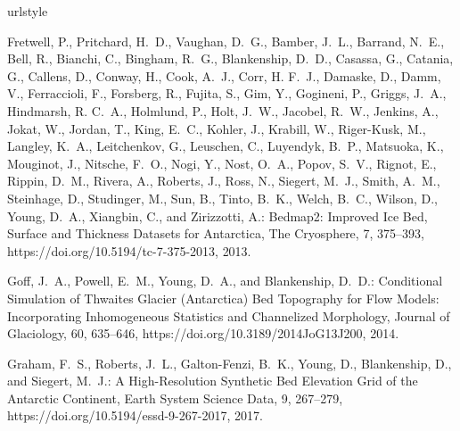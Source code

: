 \begin{thebibliography}{7}
\providecommand{\natexlab}[1]{#1}
\providecommand{\url}[1]{{\tt #1}}
\providecommand{\urlprefix}{URL }
\expandafter\ifx\csname urlstyle\endcsname\relax
  \providecommand{\doi}[1]{https://doi.org/\discretionary{}{}{}#1}\else
  \providecommand{\doi}{https://doi.org/\discretionary{}{}{}\begingroup
  \urlstyle{rm}\Url}\fi

Fretwell, P., Pritchard, H.~D., Vaughan, D.~G., Bamber, J.~L., Barrand, N.~E.,
  Bell, R., Bianchi, C., Bingham, R.~G., Blankenship, D.~D., Casassa, G.,
  Catania, G., Callens, D., Conway, H., Cook, A.~J., Corr, H. F.~J., Damaske,
  D., Damm, V., Ferraccioli, F., Forsberg, R., Fujita, S., Gim, Y., Gogineni,
  P., Griggs, J.~A., Hindmarsh, R. C.~A., Holmlund, P., Holt, J.~W., Jacobel,
  R.~W., Jenkins, A., Jokat, W., Jordan, T., King, E.~C., Kohler, J., Krabill,
  W., {Riger-Kusk}, M., Langley, K.~A., Leitchenkov, G., Leuschen, C.,
  Luyendyk, B.~P., Matsuoka, K., Mouginot, J., Nitsche, F.~O., Nogi, Y., Nost,
  O.~A., Popov, S.~V., Rignot, E., Rippin, D.~M., Rivera, A., Roberts, J.,
  Ross, N., Siegert, M.~J., Smith, A.~M., Steinhage, D., Studinger, M., Sun,
  B., Tinto, B.~K., Welch, B.~C., Wilson, D., Young, D.~A., Xiangbin, C., and
  Zirizzotti, A.: Bedmap2: Improved Ice Bed, Surface and Thickness Datasets for
  {{Antarctica}}, The Cryosphere, 7, 375--393, \doi{10.5194/tc-7-375-2013},
  2013.

Goff, J.~A., Powell, E.~M., Young, D.~A., and Blankenship, D.~D.: Conditional
  Simulation of {{Thwaites Glacier}} ({{Antarctica}}) Bed Topography for Flow
  Models: {{Incorporating}} Inhomogeneous Statistics and Channelized
  Morphology, Journal of Glaciology, 60, 635--646, \doi{10.3189/2014JoG13J200},
  2014.

Graham, F.~S., Roberts, J.~L., {Galton-Fenzi}, B.~K., Young, D., Blankenship,
  D., and Siegert, M.~J.: A High-Resolution Synthetic Bed Elevation Grid of the
  {{Antarctic}} Continent, Earth System Science Data, 9, 267--279,
  \doi{10.5194/essd-9-267-2017}, 2017.


\end{thebibliography}
